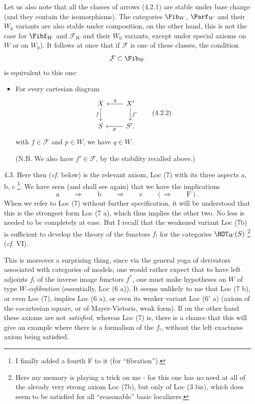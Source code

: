 Let us also note that all the classes of arrows (4.2.1) are stable under base change (and they contain the isomorphisms). The categories $\Fib_W$, $\Parf_W$ and their $W_0$ variants are also stable under composition, on the other hand, this is not the case for $\Fibf_W$ and $\mathcal{F}_W$ and their $W_0$ variants, except under special axioms on $W$ or on $W_0$). It follows at once  that if $\mathcal{F}$ is one of these classes, the condition %
\[
\mathcal{F} \subset \Fib_W
\]
is equivalent to this one:

\begin{itemize}[label={},leftmargin=3.5cm]
\item For every cartesian diagram
\[
\begin{tikzcd}
X \arrow[d, "f"'] & X' \arrow[l, "q"'] \arrow[d, "f'"] \\
S & S', \arrow[l, "p"]
\end{tikzcd}
\tag*{(4.2.2)}
\]
with $f \in \mathcal{F}$ and $p \in W$, we have $q \in W$.

(N.B. We also have $f' \in \mathcal{F}$, by the stability recalled above.)
\end{itemize}

4.3. Here then (\textit{cf.} below) is the relevant axiom, Loc (7) with its three aspects a, b, c \footnote[23]{I finally added a fourth F to it (for ``fibration'').}. We have seen (and shall see again) that we have the implications
\[
\text{a} \qquad \Longrightarrow \qquad \text{b} \qquad \Longrightarrow \qquad \text{c} \qquad (\Longrightarrow \qquad \text{F}).
\]
When we refer to Loc (7) without further specification, it will be understood that this is the strongest form Loc (7 a), which thus implies the other two. No less is needed to be completely at ease. But I recall that the weakened variant Loc (7b) is sufficient to develop the theory of the functors $f_!$ for the categories $\HOT_W(S)$ \footnote[24]{Here my memory is playing a trick on me - for this one has no need at all of the already very strong axiom Loc (7b), but only of Loc (3 bis), which does seem to be satisfied for all ``reasonable'' basic localizers. %
} (\textit{cf.} VI).


This is moreover a surprising thing, since via the general yoga of derivators associated with categories of models, one would rather expect that to have left adjoints $f_!$ of the inverse image functors $f^*$, one must make hypotheses on $W$ of type \textit{$W$-cofibration}
(essentially, Loc (6 a)). It seems unlikely to me that Loc (7 b), or even Loc (7), implies Loc (6 a), or even its weaker variant Loc (6$'$ a) (axiom of the cocartesian square, or of Mayer-Vietoris, weak form). If on the other hand these axioms are not \textit{satisfied,} whereas Loc (7) is, there is a chance that this will give an example where there is a formalism of the $f_!$, without the left exactness axiom being satisfied.

